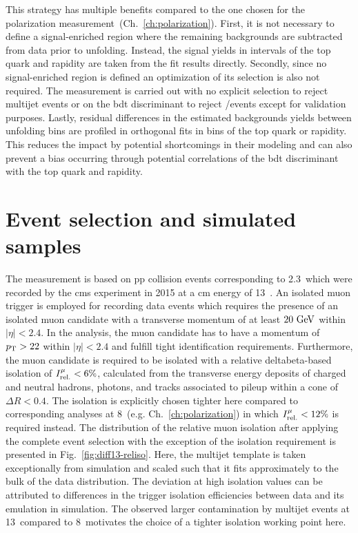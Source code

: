 This strategy has multiple benefits compared to the one chosen for the polarization measurement~(Ch.~\ref{ch:polarization}). First, it is not necessary to define a signal-enriched region where the remaining backgrounds are subtracted from data prior to unfolding. Instead, the signal yields in intervals of the top quark \pt and rapidity are taken from the fit results directly. Secondly, since no signal-enriched region is defined an optimization of its selection is also not required. The measurement is carried out with no explicit selection to reject multijet events or on the \gls{bdt} discriminant to reject \wjets/\ttbar events except for validation purposes. Lastly, residual differences in the estimated backgrounds yields between unfolding bins are profiled in orthogonal fits in bins of the top quark \pt or rapidity. This reduces the impact by potential shortcomings in their modeling and can also prevent a bias occurring through potential correlations of the \gls{bdt} discriminant with the top quark \pt and rapidity.



\section{Event selection and simulated samples}

The measurement is based on \gls{pp} collision events corresponding to 2.3~\invfb which were recorded by the \gls{cms} experiment in 2015 at a \acrlong{cm} energy of 13~\TeV. An isolated muon trigger is employed for recording data events which requires the presence of an isolated muon candidate with a transverse momentum of at least $20~\textrm{GeV}$ within $|\eta|<2.4$. In the analysis, the muon candidate has to have a momentum of $p_\textrm{T}>22$ within $|\eta|<2.4$ and fulfill tight identification requirements. Furthermore, the muon candidate is required to be isolated with a relative \gls{deltabeta}-based isolation of $I_\textrm{rel.}^{\mu}<6\%$, calculated from the transverse energy deposits of charged and neutral hadrons, photons, and tracks associated to pileup within a cone of $\Delta R<0.4$. The isolation is explicitly chosen tighter here compared to corresponding analyses at 8~\TeV (e.g. Ch.~\ref{ch:polarization}) in which $I_\textrm{rel.}^{\mu}<12\%$ is required instead. The distribution of the relative muon isolation after applying the complete event selection with the exception of the isolation requirement is presented in Fig.~\ref{fig:diff13-reliso}. Here, the multijet template is taken exceptionally from simulation and scaled such that it fits approximately to the bulk of the data distribution. The deviation at high isolation values can be attributed to differences in the trigger isolation efficiencies between data and its emulation in simulation. The observed larger contamination by multijet events at 13~\TeV compared to 8~\TeV motivates the choice of a tighter isolation working point here.


